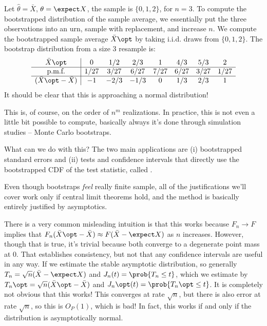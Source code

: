 \documentclass[10pt]{article}
\begin{document}
\begin{example}
	Let $\hat{\theta} = \bar{X}$, $\theta = \expect X$, the sample is $\{0,1,2\}$, for $n = 3$. To compute the bootstrapped distribution of the sample average, we essentially put the three observations into an urn, sample with replacement, and increase $n$. We compute the bootstrapped sample average $\bar{X}\opt$ by taking i.i.d. draws from $\{0,1,2\}$. The bootstrap distribution from a size 3 resample is:
	\[ \begin{array}{c|ccccccc}
		\bar{X}\opt & 0 &1/2 & 2/3 & 1 &4/3 & 5/3 & 2 \\\hline 
		\text{p.m.f.} & 1/27 & 3/27 & 6/27 & 7/27 & 6/27 & 3/27 & 1/27 \\\hline 
		(\bar{X}\opt - \bar{X}) & -1 & -2/3 & -1/3 & 0 & 1/3 & 2/3 & 1
	\end{array}\]
	It should be clear that this is approaching a normal distribution!
\end{example}

\begin{remark}
	This is, of course, on the order of $n^m$ realizations. In practice, this is not even a little bit possible to compute, basically always it's done through simulation studies -- Monte Carlo bootstraps.
\end{remark}

\begin{question}
	What can we do with this? The two main applications are (i) bootstrapped standard errors and (ii) tests and confidence intervals that directly use the bootstrapped CDF of the test statistic, called .
\end{question}

\begin{remark}
	Even though bootstraps \emph{feel} really finite sample, all of the justifications we'll cover work only if central limit theorems hold, and the method is basically entirely justified by asymptotics. 
\end{remark}

There is a very common misleading intuition is that this works because $F_n \to F$ implies that $F_n(\bar{X}\opt - \bar{X}) \approx F(\bar{X}-\expect X)$ as $n$ increases. However, though that is true, it's trivial because both converge to a degenerate point mass at 0. That establishes consistency, but not that any confidence intervals are useful in any way. If we estimate the stable asymptotic distribution, so generally $T_n = \sqrt{n}(\bar{X}-\expect X)$ and $J_n(t) = \prob\{T_n \le t\}$, which we estimate by $T_n\opt = \sqrt{n}(\bar{X}\opt - \bar{X})$ and $J_n\opt(t) = \prob\{T_n\opt \le t\}$. It is completely not obvious that this works! This converges at rate $\sqrt{n}$, but there is also error at rate $\sqrt{n}$, so this is $O_P(1)$, which is bad! In fact, this works if and only if the distribution is asymptotically normal. 
\end{document}
